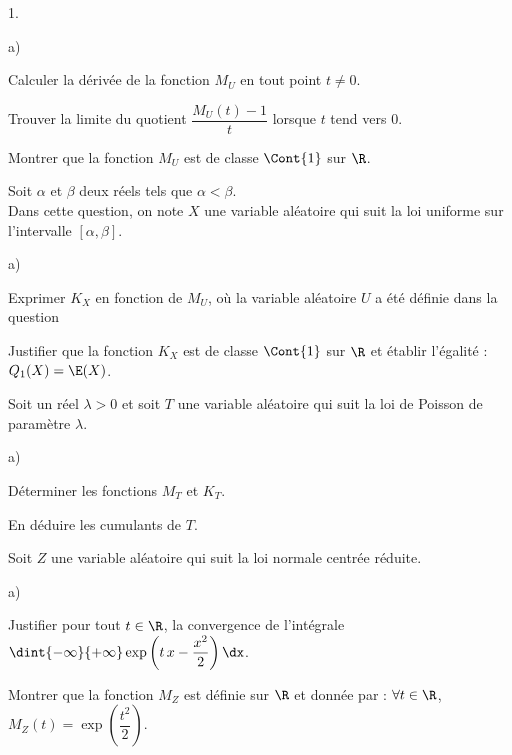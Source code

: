 \documentclass[11pt]{article}%
\begin{document}
\begin{noliste}{1.}
\begin{noliste}{a)}
  \item Calculer la dérivée de la fonction $M_U$ en tout point $t \neq
    0$.
    
  \item Trouver la limite du quotient $\dfrac{M_U(t) -1}{t}$ lorsque
    $t$ tend vers $0$.
    
  \item Montrer que la fonction $M_U$ est de classe $\Cont{1}$ sur $\R$.
  \end{noliste}


  \newpage
  
  
\item Soit $\alpha$ et $\beta$ deux réels tels que $\alpha < \beta$.\\
  Dans cette question, on note $X$ une variable aléatoire qui suit la
  loi uniforme sur l'intervalle $[\alpha, \beta]$.
  \begin{noliste}{a)}
    \setlength{\itemsep}{2mm}
  \item Exprimer $K_X$ en fonction de $M_U$, où la variable aléatoire
    $U$ a été définie dans la question 
    
  \item Justifier que la fonction $K_X$ est de classe $\Cont{1}$ sur
    $\R$ et établir l'égalité : $Q_1(X) = \E(X)$.
  \end{noliste}
  
\item Soit un réel $\lambda >0$ et soit $T$ une variable aléatoire qui
  suit la loi de Poisson de paramètre $\lambda$.
  \begin{noliste}{a)}
    \setlength{\itemsep}{2mm}
  \item Déterminer les fonctions $M_T$ et $K_T$.
    
  \item En déduire les cumulants de $T$.
  \end{noliste}
  
\item Soit $Z$ une variable aléatoire qui suit la loi normale centrée
  réduite.
  \begin{noliste}{a)}
    \setlength{\itemsep}{2mm}
  \item Justifier pour tout $t \in \R$, la convergence de l'intégrale
    $\dint{-\infty}{+\infty} \exp\left(t \, x - \dfrac{x^2}{2}\right)
    \dx$.
    
  \item Montrer que la fonction $M_Z$ est définie sur $\R$ et donnée
    par : $\forall t \in \R$, $M_Z(t) =
    \exp\left(\dfrac{t^2}{2}\right)$.
    

\end{noliste}
\end{noliste}
\end{document}
